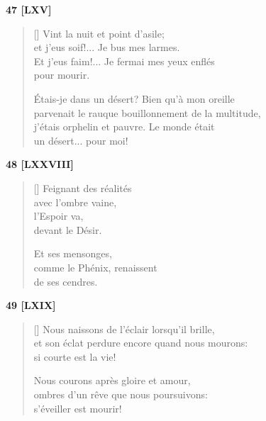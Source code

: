 \documentclass[a4paper,12pt]{book}
\begin{document}
\bigskip

\begin{center}
  \textbf{47 [LXV]}
\end{center}

\settowidth{\versewidth}{parvenait le rauque bouillonnement de la multitude,}

\begin{verse}[\versewidth]
  Vint la nuit et point d'asile; \\
  et j'eus soif!... Je bus mes larmes. \\
  Et j'eus faim!... Je fermai mes yeux enflés \\
  pour mourir.

  Étais-je dans un désert? Bien qu'à mon oreille \\
  parvenait le rauque bouillonnement de la multitude, \\
  j'étais orphelin et pauvre. Le monde était \\
  un désert... pour moi!
\end{verse}

\bigskip

\begin{center}
  \textbf{48 [LXXVIII]}
\end{center}

\settowidth{\versewidth}{comme le Phénix, renaissent}

\begin{verse}[\versewidth]
  Feignant des réalités \\
  avec l'ombre vaine, \\
  l'Espoir va, \\
  devant le Désir.

  Et ses mensonges, \\
  comme le Phénix, renaissent \\
  de ses cendres.
\end{verse}

\bigskip

\begin{center}
  \textbf{49 [LXIX]}
\end{center}

\settowidth{\versewidth}{et son éclat perdure encore quand nous mourons:}

\begin{verse}[\versewidth]
  Nous naissons de l'éclair lorsqu'il brille, \\
  et son éclat perdure encore quand nous mourons: \\
  si courte est la vie!

  Nous courons après gloire et amour, \\
  ombres d'un rêve que nous poursuivons: \\
  s'éveiller est mourir!
\end{verse}
\end{document}
